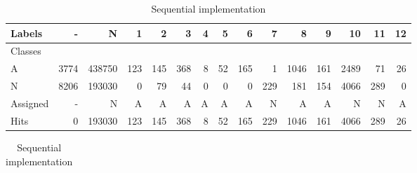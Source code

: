 \begin{table}[htb]
\caption{Confusion Matrices and Qualitative measurements}
\label{tab:confusion-matrixes-ref-serial}
\begin{subtable}[h]{\textwidth}\begin{center}
    \caption{Reference implementation}
    \begin{tabular}{l|r|r|r|r|r|r|r|r|r|r|r|r|r|r}

      Labels &     - &       N &    1 &    2 &    3 &  4 &   5 &    6 &    7 &     8 &    9 &    10 &   11 &  12 \\\hline
      Classes  &       &         &      &      &      &    &     &      &      &       &      &       &      &     \\\hline
      \hline
      A        &  3774 &  438750 &  123 &  145 &  368 &  8 &  52 &  165 &    1 &  1046 &  161 &  2489 &   71 &  26 \\\hline
      N        &  8206 &  193030 &    0 &   79 &   44 &  0 &   0 &    0 &  229 &   181 &  154 &  4066 &  289 &   0 \\\hline
      \hline
      Assigned &     - &       N &    A &    A &    A &  A &   A &    A &    N &     A &    A &     N &    N &   A \\\hline
      Hits     &     0 &  193030 &  123 &  145 &  368 &  8 &  52 &  165 &  229 &  1046 &  161 &  4066 &  289 &  26 
    \end{tabular}
    \label{tab:java-matrix}
\end{center}\end{subtable}
\begin{subtable}[h]{\textwidth}\begin{center}
    \caption{Sequential implementation}
    \begin{tabular}{l|r|r|r|r|r|r|r|r|r|r|r}


\end{tabular}
\end{center}
\end{subtable}
\end{table}
